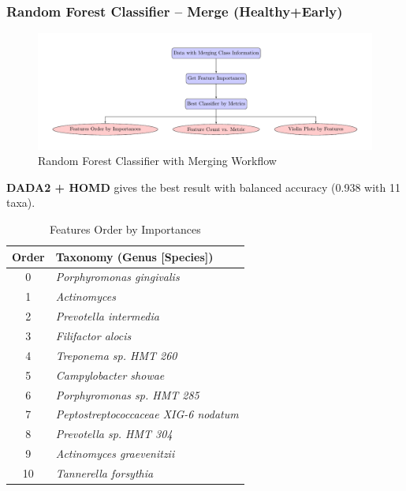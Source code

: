 \documentclass{beamer}
\begin{document}
    \begin{frame}[allowframebreaks]
        \frametitle{Random Forest Classifier -- Merge (Healthy+Early)}

        \begin{figure}
            \includegraphics[width=0.8 \linewidth]{figures/RandomForest/merge.pdf}
            \caption{Random Forest Classifier with Merging Workflow}
        \end{figure}

        \textbf{DADA2 + HOMD} gives the best result with balanced accuracy (0.938 with 11 taxa).

        \begin{table}
            \caption{Features Order by Importances}
            \begin{tabular}{c|l}
                Order & Taxonomy (Genus [Species]) \\ \hline
                0 & \textit{Porphyromonas gingivalis} \\
                1 & \textit{Actinomyces} \\
                2 & \textit{Prevotella intermedia} \\
                3 & \textit{Filifactor alocis} \\
                4 & \textit{Treponema sp. HMT 260} \\
                5 & \textit{Campylobacter showae} \\
                6 & \textit{Porphyromonas sp. HMT 285} \\
                7 & \textit{Peptostreptococcaceae XIG-6 nodatum} \\
                8 & \textit{Prevotella sp. HMT 304} \\
                9 & \textit{Actinomyces graevenitzii} \\
                10 & \textit{Tannerella forsythia} \\
            \end{tabular}
        \end{table}


\end{frame}
\end{document}
